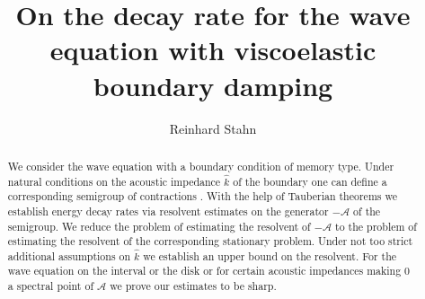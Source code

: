 \documentclass{amsart}
\newcommand{\A}{\mathcal{A}}
\newcommand{\khat}{\hat{k}}
\begin{document}
\title[Decay via viscoelastic boundary damping]{On the decay rate for the wave equation with viscoelastic boundary damping}
\author[Reinhard Stahn]{Reinhard Stahn}

\begin{abstract} 
We consider the wave equation with a boundary condition of memory type. Under natural conditions on the acoustic impedance $\khat$ of the boundary one can define a corresponding semigroup of contractions \cite{DFMP2010a}. With the help of Tauberian theorems we establish energy decay rates via resolvent estimates on the generator $-\A$ of the semigroup. We reduce the problem of estimating the resolvent of $-\A$ to the problem of estimating the resolvent of the corresponding stationary problem. Under not too strict additional assumptions on $\khat$ we establish an upper bound on the resolvent. For the wave equation on the interval or the disk or for certain acoustic impedances making $0$ a spectral point of $\A$ we prove our estimates to be sharp.
\end{abstract}

\maketitle

{\let\thefootnote\relax{}}
{\let\thefootnote\relax{}}



\end{document}
